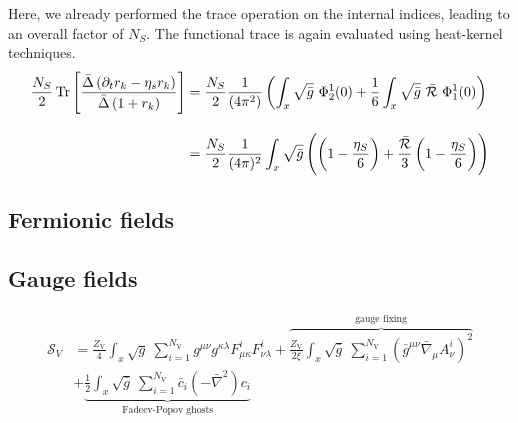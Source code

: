 Here, we already performed the trace operation on the internal indices, leading to an overall factor of $N_S$. The functional trace is again evaluated using heat-kernel techniques.
\begin{equation}
\begin{aligned}
	\frac{N_S}{2}\operatorname{Tr}\left[ \frac{\bar{\Delta}\left(\partial_t r_k - \eta_s r_k\right)}{\bar{\Delta}\left(1 + r_k\right)} \right] &= \frac{N_S}{2}\frac{1}{(4\pi^2)}\left(\int_x\sqrt{\bar{g}} \  \Phi_2^1(0) + \frac{1}{6}\int_x\sqrt{\bar{g}} \ \bar{\mathcal{R}}\ \Phi_1^1(0) \right)\\[10pt]
	&= 	\frac{N_S}{2}\frac{1}{(4\pi)^2}\int_x\sqrt{\bar{g}}\left(\left(1-\frac{\eta_S}{6}\right) + \frac{\bar{\mathcal{R}}}{3}\left(1-\frac{\eta_S}{6}\right)\right)
\end{aligned}
\end{equation}
\subsection{Fermionic  fields}
\blindtext %

\subsection{Gauge fields}  
\begin{equation}
\begin{aligned}
\mathcal{S}_{V} &= \frac{Z_{\text{V}}}{4}\int_x \sqrt{g} \ \sum\limits_{i=1}^{N_{\text{V}}} g^{\mu\nu}g^{\kappa\lambda}F^{i}_{\mu\kappa}F^{i}_{\nu\lambda}  
		+ \overbrace{\frac{Z_{\text{V}}}{2\xi}\int_x \sqrt{\bar{g}} \ \sum\limits_{i=1}^{N_{\text{V}}} \left(\bar{g}^{\mu\nu}\bar{\nabla}_{\mu}A_{\nu}^{i}\right)^2}^{\text{gauge fixing}}  \nonumber\\
		&+ \underbrace{\frac{1}{2}\int_x \sqrt{\bar{g}} \ \sum\limits_{i=1}^{N_{\text{V}}} \bar{c}_i(-\bar{\nabla}^2)c_i}_{\text{Fadeev-Popov ghosts}} 
\end{aligned}
\end{equation}



